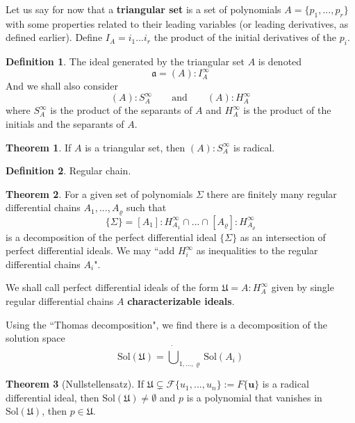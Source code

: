 \documentclass{article}
\theoremstyle{definition}
\newtheorem{thm}{Theorem}
\newtheorem*{defn}{Definition}
\newcommand{\Sol}{\text{Sol}}
\begin{document}
Let us say for now that a \textbf{triangular set} is a set of polynomials $A=\{p_1,...,p_r\}$  with some properties related to their leading variables (or leading derivatives, as defined earlier). Define $I_A=i_1...i_r$ the product of the initial derivatives of the $p_i$.
\begin{defn}
    The ideal generated by the triangular set $A$ is denoted $$\mathfrak a=(A):I^\infty_A$$And we shall also consider $$(A):S_A^\infty\qquad\text{and}\qquad(A):H_A^\infty$$ where $S^\infty_A$ is the product of the separants of $A$ and $H_A^\infty$ is the product of the initials and the separants of $A$.
\end{defn}
\begin{thm}
    If $A$ is a triangular set, then $(A):S_A^\infty$ is radical.
\end{thm}
\begin{defn}
    Regular chain.
\end{defn}
\begin{thm}
For a given set of polynomials $\Sigma$ there are finitely many regular differential chains $A_1,...,A_\varrho$ such that $$\{\Sigma \}=[A_1]:H^\infty_{A_1}\cap...\cap [A_\varrho]:H^\infty_{A_\varrho}$$ is a decomposition of the perfect differential ideal $\{\Sigma\}$ as an intersection of perfect differential ideals. We may ``add $H_i^\infty$ as inequalities to the regular differential chains $A_i$".
\end{thm}
We shall call perfect differential ideals of the form $\mathfrak U=A:H^\infty_A$ given by single regular differential chains $A$ \textbf{characterizable ideals}.\par
Using the ``Thomas decomposition", we find there is a decomposition of the solution space
$$\Sol(\mathfrak U)=\dot\bigcup_{1,...,\varrho}\Sol(A_i)$$
\begin{thm}[Nullstellensatz]
    If $\mathfrak U\subsetneq \mathcal F\{u_1,...,u_n\}:=F\{\mathbf{u}\}$ is a radical differential ideal, then $\Sol(\mathfrak U)\neq\emptyset$ and $p$ is a polynomial that vanishes in $\Sol(\mathfrak U)$, then $p\in\mathfrak U$.
\end{thm}
\end{document}

